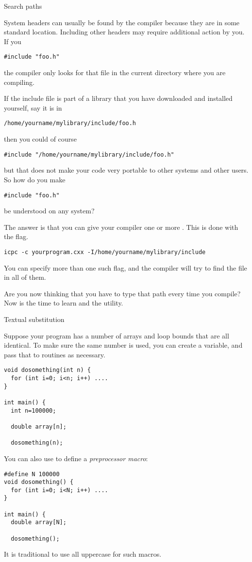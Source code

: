 {Search paths}

System headers can usually be found by the compiler because they
are in some standard location.
Including other headers may require additional action by you.
If you 
\begin{lstlisting}
#include "foo.h"
\end{lstlisting}
the compiler only looks for that file in the current directory
where you are compiling.

If the include file is part of a library that you have downloaded
and installed yourself, say it is in
\begin{verbatim}
/home/yourname/mylibrary/include/foo.h
\end{verbatim}
then you could of course
\begin{lstlisting}
#include "/home/yourname/mylibrary/include/foo.h"
\end{lstlisting}
but that does not make your code very portable to other systems
and other users.
So how do you make
\begin{lstlisting}
#include "foo.h"
\end{lstlisting}
be understood on any system?

The answer is that you can give your compiler one or more .
This is done with the  flag.
\begin{verbatim}
icpc -c yourprogram.cxx -I/home/yourname/mylibrary/include
\end{verbatim}
You can specify more than one such flag, and the compiler will try to find
the  file in all of them.

Are you now thinking that you have to type that path every time you compile?
Now is the time to learn  and the  utility.

 {Textual substitution}

Suppose your program has a number of arrays and loop bounds that are
all identical. To make sure the same number is used, you can create a
variable, and pass that to routines as necessary.
\begin{lstlisting}
void dosomething(int n) {
  for (int i=0; i<n; i++) ....
}

int main() {
  int n=100000;

  double array[n];
   
  dosomething(n);
\end{lstlisting}
You can also use  to define a
\emph{preprocessor macro}:
\begin{lstlisting}
#define N 100000
void dosomething() {
  for (int i=0; i<N; i++) ....
}

int main() {
  double array[N];
   
  dosomething();
\end{lstlisting}
It is traditional to use all uppercase for such macros.

